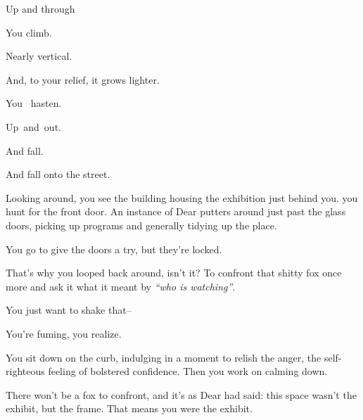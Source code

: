 Up and through

\null
\vfill

\newpage

\newpage

\null
\vspace{2in}

You climb.

\newpage

\null
\vspace{1.5in}

Nearly vertical.

\newpage

\null
\vspace{1in}

And, to your relief, it grows lighter.

\newpage

\null
\vspace{0.5in}

You {\large\ hasten.}

\newpage

{\large Up}{\Large\ and}{\LARGE\ out.}

\newpage

\null
\vfill

\begin{flushright}
  \footnotesize
  And fall.\hspace{1cm}\null
\end{flushright}


\newpage

And fall onto the street.

Looking around, you see the building housing the exhibition just behind you. you hunt for the front door. An instance of Dear putters around just past the glass doors, picking up programs and generally tidying up the place.

You go to give the doors a try, but they're locked.

That's why you looped back around, isn't it? To confront that shitty fox once more and ask it what it meant by \emph{``who is watching''}.

You just want to shake that--

You're fuming, you realize.

You sit down on the curb, indulging in a moment to relish the anger, the self-righteous feeling of bolstered confidence. Then you work on calming down.

There won't be a fox to confront, and it's as Dear had said: this space wasn't the exhibit, but the frame. That means you were the exhibit.

